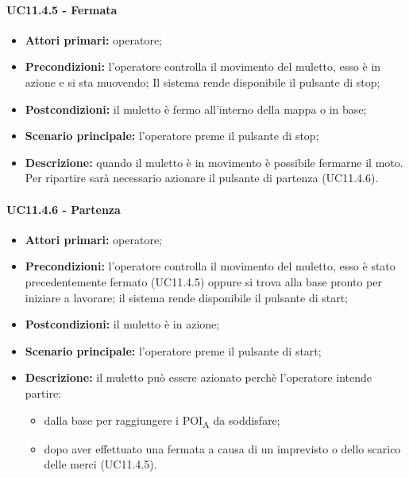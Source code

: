 \paragraph{UC11.4.5 - Fermata}
\begin{itemize}
	\item 	\textbf{Attori primari:} operatore;
	\item 	\textbf{Precondizioni:} l'operatore controlla il movimento del muletto, esso è in azione e si sta muovendo; Il sistema rende disponibile il pulsante di stop;
	\item 	\textbf{Postcondizioni:} il muletto è fermo all'interno della mappa o in base;
	\item 	\textbf{Scenario principale:} l'operatore preme il pulsante di stop;
	\item 	\textbf{Descrizione:} quando il muletto è in movimento è possibile fermarne il moto. Per ripartire sarà necessario azionare il pulsante di partenza (UC11.4.6).
\end{itemize}


\paragraph{UC11.4.6 - Partenza}
\begin{itemize}
	\item 	\textbf{Attori primari:} operatore;
	\item 	\textbf{Precondizioni:} l'operatore controlla il movimento del muletto, esso è stato precedentemente fermato (UC11.4.5) oppure si trova alla base pronto per iniziare a lavorare; il sistema rende disponibile il pulsante di start;
	\item 	\textbf{Postcondizioni:} il muletto è in azione;
	\item 	\textbf{Scenario principale:} l'operatore preme il pulsante di start;
	\item 	\textbf{Descrizione:} il muletto può essere azionato perchè l'operatore intende partire:
	\begin{itemize}
		\item dalla base per raggiungere i POI\textsubscript{A} da soddisfare;
		\item dopo aver effettuato una fermata a causa di un imprevisto o dello scarico delle merci (UC11.4.5).
	\end{itemize}
\end{itemize}



